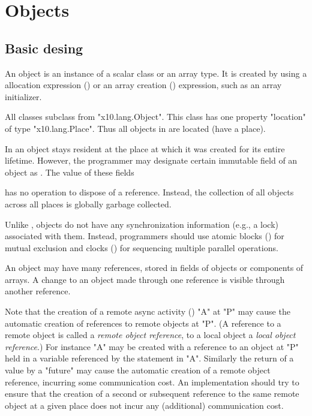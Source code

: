 \chapter{Objects}\label{XtenObjects}

\section{Basic desing}
An object is an instance of a scalar class or an array type.  It is
created by using a allocation expression
() or an array creation
() expression, such as an array
initializer. 

All classes subclass from \xcd"x10.lang.Object".
This class has one property \xcd"location" of type
\xcd"x10.lang.Place".  Thus all objects in \Xten{}
are located (have a place). 

In \XtenCurrVer{} an object stays resident at the place at
which it was created for its entire lifetime. However, the
programmer may designate certain immutable field of an object
as . The value of these fields 

{}\Xten{} has no operation to dispose of a reference.  Instead, the
collection of all objects across all places is globally garbage
collected.

Unlike \java{},
{}\Xten{} objects do not have any synchronization information (e.g.,
a lock) associated with them. 
Instead, programmers should use atomic blocks
() for mutual exclusion and clocks
() for sequencing multiple parallel operations.

An object may have many references, stored in fields of
objects or components of arrays. A change to an object made through
one reference is visible through another reference. 

Note that the creation of a remote async activity
() \xcd"A" at \xcd"P" may cause the automatic creation of
references to remote objects at \xcd"P". (A reference to a remote
object is called a {\em remote object reference}, to a local object a
{\em local object reference}.)  For instance \xcd"A" may be created
with a reference to an object at \xcd"P" held in a variable referenced
by the statement in \xcd"A".  Similarly the return of a value by a
\xcd"future" may cause the automatic creation of a remote object
reference, incurring some communication cost.  An {}\Xten{}
implementation should try to ensure that the creation of a second or
subsequent reference to the same remote object at a given place does
not incur any (additional) communication cost.

